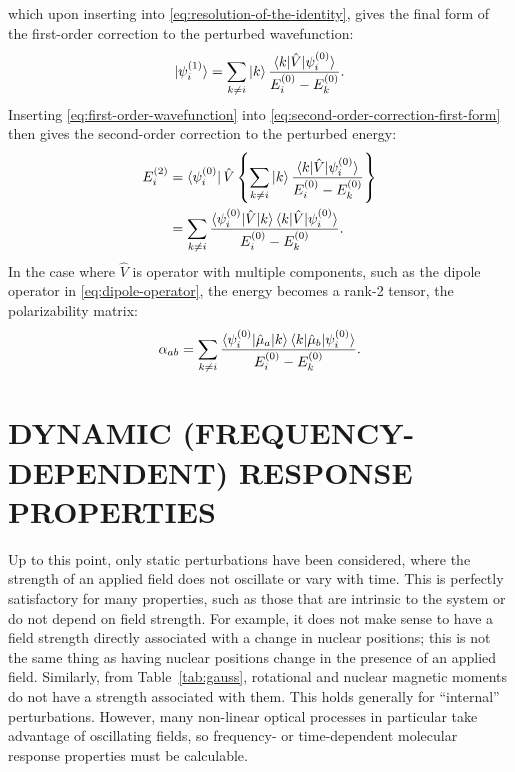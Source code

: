 \documentclass[%
class = book,%
crop = false,%
float = true,%
multi = true,%
preview = false,%
]{standalone}
\newcommand{\caps}[1]{\uppercase{#1}}
\begin{document}
which upon inserting into \eqref{eq:resolution-of-the-identity}, gives the final form of the first-order correction to the perturbed wavefunction:
\begin{equation}
  \label{eq:first-order-wavefunction}
  \ket{\psi_{i}^{(1)}} = \sum_{k\neq i} \ket{k} \frac{\braket{k|\hat{V}|\psi_{i}^{(0)}}}{E_{i}^{(0)} - E_{k}^{(0)}}.
\end{equation}
Inserting \eqref{eq:first-order-wavefunction} into \eqref{eq:second-order-correction-first-form} then gives the second-order correction to the perturbed energy:
\begin{equation}
  \label{eq:second-order-energy}
  \begin{aligned}
    E_{i}^{(2)} &= \bra{\psi_{i}^{(0)}} \hat{V} \left\{ \sum_{k\neq i} \ket{k} \frac{\braket{k|\hat{V}|\psi_{i}^{(0)}}}{E_{i}^{(0)} - E_{k}^{(0)}} \right\} \\
    &= \sum_{k \neq i} \frac{\braket{\psi_{i}^{(0)}|\hat{V}|k}\braket{k|\hat{V}|\psi_{i}^{(0)}}}{E_{i}^{(0)} - E_{k}^{(0)}}.
  \end{aligned}
\end{equation}
In the case where \(\hat{V}\) is operator with multiple components, such as the dipole operator in \eqref{eq:dipole-operator}, the energy becomes a rank-2 tensor, the polarizability matrix:
\begin{equation}
  \label{eq:static-polarizability-from-perturbation-theory}
  \alpha_{ab}= \sum_{k \neq i} \frac{\braket{\psi_{i}^{(0)}|\hat{\mu}_{a}|k}\braket{k|\hat{\mu}_{b}|\psi_{i}^{(0)}}}{E_{i}^{(0)} - E_{k}^{(0)}}.
\end{equation}

\section{\texorpdfstring{\caps{Dynamic (frequency-dependent) response properties}}{Static (time-independent) response properties}}
\label{sec:dynamic-properties}

Up to this point, only static perturbations have been considered, where the strength of an applied field does not oscillate or vary with time. This is perfectly satisfactory for many properties, such as those that are intrinsic to the system or do not depend on field strength. For example, it does not make sense to have a field strength directly associated with a change in nuclear positions; this is not the same thing as having nuclear positions change in the presence of an applied field. Similarly, from Table~\ref{tab:gauss}, rotational and nuclear magnetic moments do not have a strength associated with them. This holds generally for ``internal'' perturbations. However, many non-linear optical processes in particular take advantage of oscillating fields, so frequency- or time-dependent molecular response properties must be calculable.
\end{document}

